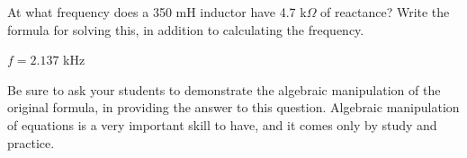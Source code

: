 

At what frequency does a 350 mH inductor have 4.7 k$\Omega$ of reactance?  Write the formula for solving this, in addition to calculating the frequency.







$f = 2.137$ kHz







Be sure to ask your students to demonstrate the algebraic manipulation of the original formula, in providing the answer to this question.  Algebraic manipulation of equations is a very important skill to have, and it comes only by study and practice.




